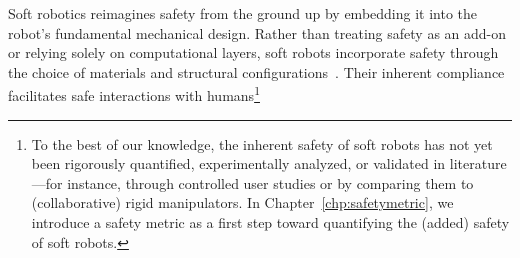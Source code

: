 Soft robotics reimagines safety from the ground up by embedding it into the robot’s fundamental mechanical design. Rather than treating safety as an add-on or relying solely on computational layers, soft robots incorporate safety through the choice of materials and structural configurations~\citep{rus2015design, laschi2016soft}. Their inherent compliance facilitates safe interactions with humans\footnote{
To the best of our knowledge, the inherent safety of soft robots has not yet been rigorously quantified, experimentally analyzed, or validated in literature—for instance, through controlled user studies or by comparing them to (collaborative) rigid manipulators. In Chapter~\ref{chp:safetymetric}, we introduce a safety metric as a first step toward quantifying the (added) safety of soft robots.
} 

